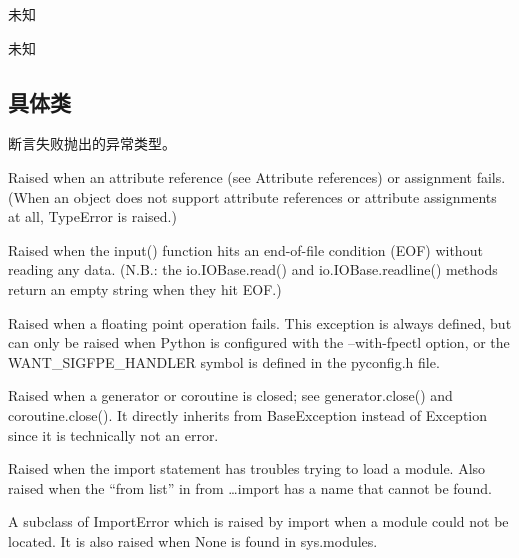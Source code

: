 \noindent{\color{red}{exception BufferError:}}
\par{未知}\\

\noindent{\color{red}{exception LookupError:}}
\par{未知}\\






\subsection{具体类}
\noindent{\color{red}{exception AssertionError:}}
\par{断言失败抛出的异常类型。}\\

\noindent{\color{red}{exception AttributeError:}}
\par{Raised when an attribute reference (see Attribute references) or assignment fails. (When an object does not support
 attribute references or attribute assignments at all, TypeError is raised.)}\\

\noindent{\color{red}{exception EOFError:}}
\par{Raised when the input() function hits an end-of-file condition (EOF) without reading any data. (N.B.: the
  io.IOBase.read() and io.IOBase.readline() methods return an empty string when they hit EOF.)}\\

\noindent{\color{red}{exception FloatingPointError:}}
\par{Raised when a floating point operation fails. This exception is always defined, but can only be raised when Python
  is configured with the --with-fpectl option, or the WANT\_SIGFPE\_HANDLER symbol is defined in the pyconfig.h file.}\\

\noindent{\color{red}{exception GeneratorExit:}}
\par{Raised when a generator or coroutine is closed; see generator.close() and coroutine.close(). It directly inherits
  from BaseException instead of Exception since it is technically not an error.}\\

\noindent{\color{red}{exception ImportError:}}
\par{Raised when the import statement has troubles trying to load a module. Also raised when the “from list” in from
 \dots import has a name that cannot be found.}\\

\noindent{\color{red}{exception ModuleNotFoundError:}}
\par{A subclass of ImportError which is raised by import when a module could not be located. It is also raised when None
is found in sys.modules.}\\








